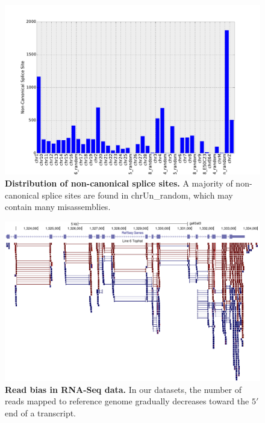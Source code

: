 \documentclass[10pt]{article}
\begin{document}
\begin{figure}[!ht]
\begin{center}
\includegraphics[width=6in]{noncanonical.pdf}
\end{center}
\caption{
{\bf Distribution of non-canonical splice sites.} A majority of non-canonical
splice sites are found in chrUn\_random, which may contain many misassemblies.}
\label{Figure_label}
\end{figure}

\begin{figure}[!ht]
\begin{center}
\includegraphics[width=6in]{read_bias.pdf}
\end{center}
\caption{
{\bf Read bias in RNA-Seq data.} In our datasets, the number of reads
mapped to reference genome gradually decreases toward the $5'$ end
of a transcript.
}
\label{Figure_label}
\end{figure}
\end{document}
